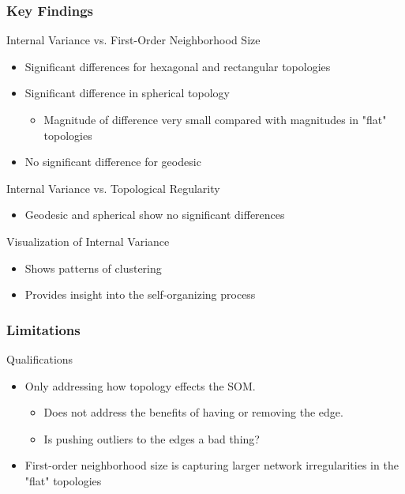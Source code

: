 \documentclass[nototal,handout]{beamer}
\begin{document}
\begin{frame}
	\frametitle{Key Findings}
 
\begin{block}{Internal Variance vs. First-Order Neighborhood Size}
 \begin{itemize}
 \item  Significant differences for hexagonal and rectangular topologies
 \item  Significant difference in spherical topology
 \begin{itemize}
 \item  Magnitude of difference very small compared with magnitudes in "flat" topologies
 \end{itemize}
 \item  No significant difference for geodesic
 \end{itemize}
 \end{block} 
\begin{block}{Internal Variance vs. Topological Regularity}
 \begin{itemize}
 \item  Geodesic and spherical show no significant differences
 \end{itemize}
 \end{block} 
\begin{block}{Visualization of Internal Variance}
 \begin{itemize}
 \item  Shows patterns of clustering
 \item  Provides insight into the self-organizing process
 \end{itemize}
 \end{block} \end{frame} 

\begin{frame}
	\frametitle{Limitations}
 
\begin{block}{Qualifications}
 \begin{itemize}
 \item  Only addressing how topology effects the SOM.
 \begin{itemize}
 \item  Does not address the benefits of having or removing the edge.
 \item  Is pushing outliers to the edges a bad thing?
 \end{itemize}
 \item  First-order neighborhood size is capturing larger network irregularities in the "flat" topologies
 \end{itemize}
 \end{block} \end{frame} 
\end{document}
